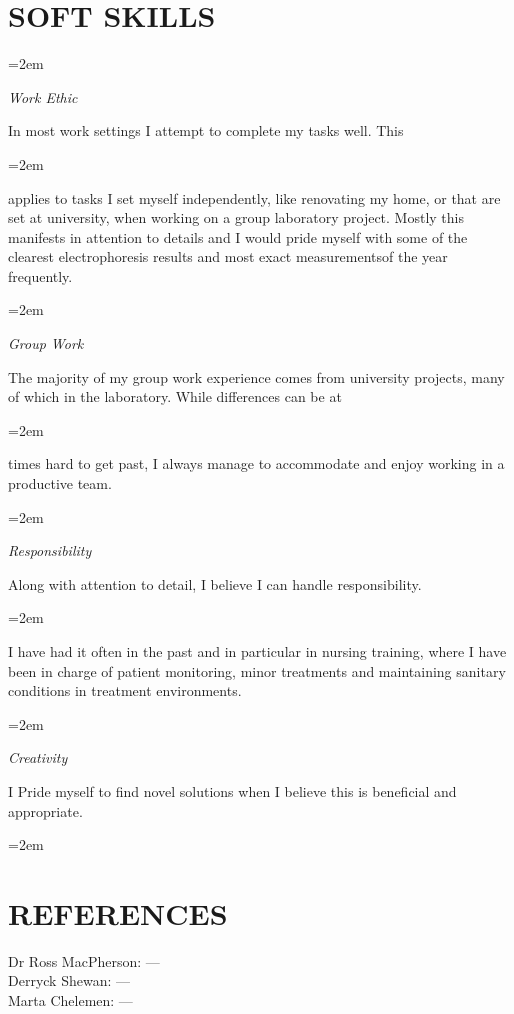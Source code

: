 \documentclass[paper=a4,fontsize=11pt]{scrartcl} %
\newlength{\spacebox}
\newcommand{\sepspace}{\vspace*{1em}}		%
\newcommand{\NewPart}[1]{\section*{\uppercase{#1}}}
\newcommand{\PersonalEntry}[2]{
		\noindent\hangindent=2em\hangafter=0 %
		\parbox{\spacebox}{        %
		\textit{#1}}		       %
		\hspace{1.5em} #2 \par}    %
\newcommand{\SkillsEntry}[2]{      %
		\noindent\hangindent=2em\hangafter=0 %
		\parbox{\spacebox}{        %
		\textit{#1}}			   %
		\hspace{1.5em} \parbox{6\spacebox}{#2} \par}    %
\begin{document}
\clearpage
\NewPart{Soft Skills}{}

\SkillsEntry{Work Ethic}{In most work settings I attempt to complete my tasks well. This }
\vspace{3pt}
\SkillsEntry{}{applies to tasks I set myself independently, like renovating my home, or that are set at university, when working on a group laboratory project. Mostly this manifests in attention to details and I would pride myself with some of the clearest electrophoresis results and most exact measurementsof the year frequently.}
\sepspace

\SkillsEntry{Group Work}{The majority of my group work experience comes from university projects, many of which in the laboratory. While differences can be at }
\vspace{3pt}
\SkillsEntry{}{times hard to get past, I always manage to accommodate and enjoy working in a productive team.}
\sepspace

\SkillsEntry{Responsibility}{Along with attention to detail, I believe I can handle responsibility. }
\vspace{3pt}
\SkillsEntry{}{I have had it often in the past and in particular in nursing training, where  I have been in charge of patient monitoring, minor treatments and maintaining sanitary conditions in treatment environments.}
\sepspace

\SkillsEntry{Creativity}{I Pride myself to find novel solutions when I believe this is beneficial and appropriate.}
\vspace{3pt}
\SkillsEntry{}{}
\sepspace

\NewPart{References}

Dr Ross MacPherson: --- \\
Derryck Shewan: --- \\
Marta Chelemen: ---

%

%



\end{document}
